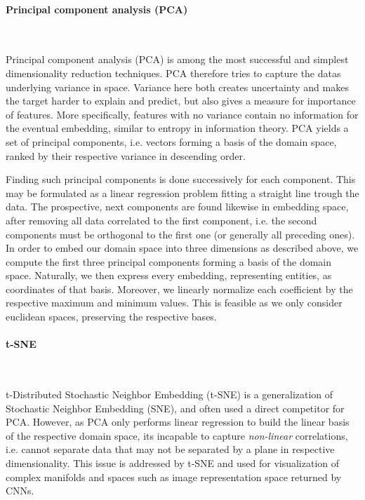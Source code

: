 \documentclass[]{article}
\renewcommand{\cite}{\citep}
\begin{document}
\paragraph{Principal component analysis (PCA)}\mbox{}\\
\label{sec:pca}


Principal component analysis (PCA) \cite{abdi2010principal, wold1987principal} is among the most successful and simplest dimensionality reduction techniques. PCA therefore tries to capture the datas underlying variance in space. Variance here both creates uncertainty and makes the target harder to explain and predict, but also gives a measure for importance of features. More specifically, features with no variance contain no information for the eventual embedding, similar to entropy in information theory. PCA yields a set of principal components, i.e. vectors forming a basis of the domain space, ranked by their respective variance in descending order. 

Finding such principal components is done successively for each component. This may be formulated as a linear regression problem fitting a straight line trough the data. The prospective, next components are found likewise in embedding space, after removing all data correlated to the first component, i.e. the second components must be orthogonal to the first one (or generally all preceding ones). In order to embed our domain space into three dimensions as described above, we compute the first three principal components forming a basis of the domain space. Naturally, we then express every embedding, representing entities, as coordinates of that basis. Moreover, we linearly normalize each coefficient by the respective maximum and minimum values. This is feasible as we only consider euclidean spaces, preserving the respective bases.

\paragraph{t-SNE}\mbox{}\\
\label{sec:tsne}

t-Distributed Stochastic Neighbor Embedding (t-SNE) \cite{van2008visualizing} is a generalization of Stochastic Neighbor Embedding (SNE), and often used a direct competitor for PCA. However, as PCA only performs linear regression to build the linear basis of the respective domain space, its incapable to capture \textit{non-linear} correlations, i.e. cannot separate data that may not be separated by a plane in respective dimensionality. This issue is addressed by t-SNE and used for visualization of complex manifolds and spaces such as image representation space returned by CNNs. \\
\end{document}
